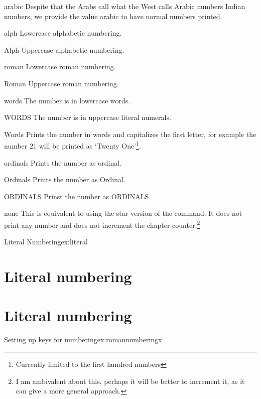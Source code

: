 \begin{decription}
\begin{marglist}
\item [arabic] Despite that the Arabs call what the West calls Arabic numbers Indian numbers, we provide the value arabic to have normal numbers printed.
\item [alph] Lowercase alphabetic numbering.
\item [Alph] Uppercase alphabetic numbering.
\item [roman] Lowercase roman numbering.
\item [Roman] Uppercase roman numbering.
\item [words] The number is in lowercase words.
\item [WORDS] The number is in uppercase literal numerals.
\item [Words] Prints the number in words and capitalizes the first letter, for example the number 21 will be printed as `Twenty One'\footnote{Currently limited to the first hundred numbers}.
\item [ordinals] Prints the number as ordinal.
\item [Ordinals] Prints the number as Ordinal.
\item [ORDINALS] Prinst the number as ORDINALS.
\item [none] This is equivalent to using the star version of the command. It does not print any number and does not increment the chapter counter.\footnote{I am ambivalent about this, perhaps it will be better to increment it, as it can give a more general approach.}

\end{marglist}
\begin{texexample}{Literal Numbering}{ex:literal}
\chapter{Literal numbering}
\lorem
{}
\chapter{Literal numbering} 
\lorem
\end{texexample}





\begin{texexample}{Setting up keys for numbering}{ex:romannumberingx}
\bgroup
{}

\end{texexample}
\end{decription}
